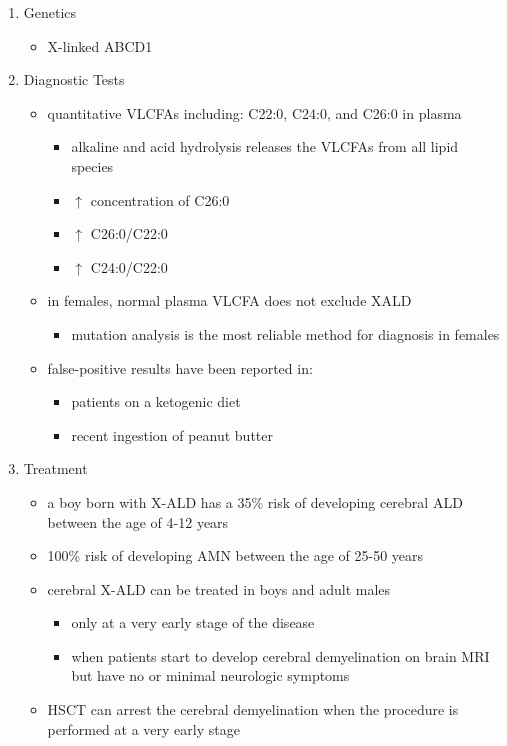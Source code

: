\documentclass{scrartcl}
\begin{document}
\begin{enumerate}
\item Genetics
\label{sec:org4fd214b}
\begin{itemize}
\item X-linked ABCD1
\end{itemize}

\item Diagnostic Tests
\label{sec:orgcee2471}
\begin{itemize}
\item quantitative VLCFAs including: C22:0, C24:0, and C26:0 in plasma
\begin{itemize}
\item alkaline and acid hydrolysis releases the VLCFAs from all lipid
species
\item \(\uparrow\) concentration of C26:0
\item \(\uparrow\) C26:0/C22:0
\item \(\uparrow\) C24:0/C22:0
\end{itemize}

\item in females, normal plasma VLCFA does not exclude XALD
\begin{itemize}
\item mutation analysis is the most reliable method for diagnosis in females
\end{itemize}

\item false-positive results have been reported in:
\begin{itemize}
\item patients on a ketogenic diet
\item recent ingestion of peanut butter
\end{itemize}
\end{itemize}

\item Treatment
\label{sec:orgebe8399}
\begin{itemize}
\item a boy born with X-ALD has a 35\% risk of developing cerebral ALD
between the age of 4-12 years
\item 100\% risk of developing AMN between the age of 25-50 years
\item cerebral X-ALD can be treated in boys and adult males
\begin{itemize}
\item only at a very early stage of the disease
\item when patients start to develop cerebral demyelination on brain MRI
but have no or minimal neurologic symptoms
\end{itemize}
\item HSCT can arrest the cerebral demyelination when the procedure is
performed at a very early stage
\end{itemize}
\end{enumerate}
\end{document}
